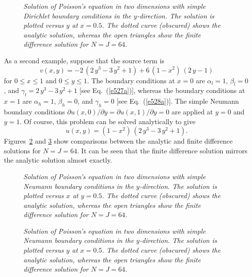 \begin{figure}
\epsfysize=3in
\centerline{}
\caption{\em Solution of Poisson's equation in two dimensions  with simple
Dirichlet boundary conditions in the $y$-direction. The solution is plotted versus $y$ at
$x=0.5$.
The dotted curve (obscured)
shows the analytic solution, whereas the open triangles show the finite difference
solution for $N=J=64$.}\label{p2db}
\end{figure}

As a second example, suppose that the source term is
\begin{equation}
v(x,y) =-2\,(2\,y^3-3\,y^2+1) + 6\,(1-x^2)\,(2\,y-1)
\end{equation}
for $0\leq x \leq 1$ and $0\leq y \leq 1$. The boundary conditions
at $x=0$ are $\alpha_l=1$, $\beta_l=0$, and $\gamma_l=2\,y^3-3\,y^2+1$ [see Eq.~(\ref{e527a})], whereas
the boundary conditions at $x=1$ are $\alpha_h=1$, $\beta_h=0$,
and  $\gamma_h=0$ [see Eq.~(\ref{e528a})]. The simple Neumann boundary
conditions $\partial u(x,0)/\partial y=\partial u(x,1)/\partial y=0$ are applied at $y=0$ and $y=1$. Of course,
this problem can be solved analytically to give
\begin{equation}
u(x,y) = (1-x^2)\,(2\,y^3-3\,y^2+1).
\end{equation}
Figures~\ref{p2dc} and \ref{p2dd} show comparisons between the analytic and finite difference
solutions for $N=J=64$. It can be seen that the finite difference solution mirrors
the analytic solution almost exactly.

\begin{figure}
\epsfysize=3in
\centerline{}
\caption{\em Solution of Poisson's equation in two dimensions  with simple
Neumann boundary conditions in the $y$-direction. The solution is plotted versus $x$ at
$y=0.5$.
The dotted curve (obscured)
shows the analytic solution, whereas the open triangles show the finite difference
solution for $N=J=64$.}\label{p2dc}
\end{figure}

\begin{figure}
\epsfysize=3in
\centerline{}
\caption{\em Solution of Poisson's equation in two dimensions  with simple
Neumann boundary conditions in the $y$-direction. The solution is plotted versus $y$ at
$x=0.5$.
The dotted curve (obscured)
shows the analytic solution, whereas the open triangles show the finite difference
solution for $N=J=64$.}\label{p2dd}
\end{figure}


